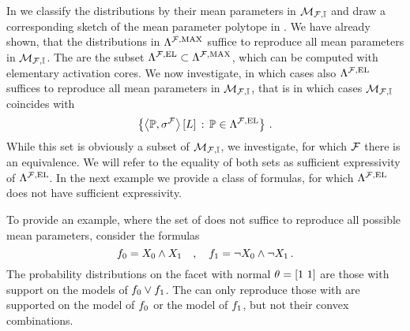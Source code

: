 In  we classify the distributions by their mean parameters in $\mathcal{M}_{\mathcal{F},\mathbb{I}}$ and draw a corresponding sketch of the mean parameter polytope in .
We have already shown, that the distributions in $\Lambda^{\mathcal{F},\mathrm{MAX}}$ suffice to reproduce all mean parameters in $\mathcal{M}_{\mathcal{F},\mathbb{I}}$.
The \HybridLogicNetworks{} are the subset $\Lambda^{\mathcal{F},\mathrm{EL}}\subset\Lambda^{\mathcal{F},\mathrm{MAX}}$, which can be computed with elementary activation cores.
We now investigate, in which cases also $\Lambda^{\mathcal{F},\mathrm{EL}}$ suffices to reproduce all mean parameters in $\mathcal{M}_{\mathcal{F},\mathbb{I}}$, that is in which cases $\mathcal{M}_{\mathcal{F},\mathbb{I}}$ coincides with
\begin{align*}
    \left\{ \left\langle \mathbb{P},\sigma^{\mathcal{F}}\right\rangle \left[ L \right] \,:\, \mathbb{P}\in\Lambda^{\mathcal{F},\mathrm{EL}} \right\} \, .
\end{align*}
While this set is obviously a subset of $\mathcal{M}_{\mathcal{F},\mathbb{I}}$, we investigate, for which $\mathcal{F}$ there is an equivalence.
We will refer to the equality of both sets as sufficient expressivity of $\Lambda^{\mathcal{F},\mathrm{EL}}$.
In the next example we provide a class of formulas, for which $\Lambda^{\mathcal{F},\mathrm{EL}}$ does not have sufficient expressivity.

\begin{example}
    \label{exa:insufficientHLNsetExpressivity}
    To provide an example, where the set of \HybridLogicNetworks{} does not suffice to reproduce all possible mean parameters, consider the formulas
    \[ f_{0} = X_{0} \land X_{1} \quad, \quad f_{1} = \lnot X_{0} \land \lnot X_{1} \, . \]
    The probability distributions on the facet with normal $\theta=[1\,\, 1]$ are those with support on the models of $f_{0}\lor f_{1}$.
    The \HybridLogicNetworks{} can only reproduce those with are supported on the model of $f_{0}$ or the model of $f_{1}$, but not their convex combinations.

\end{example}


